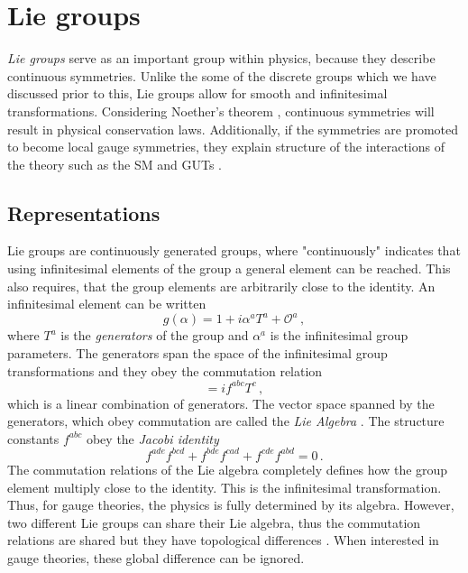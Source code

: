 \section{Lie groups} \label{app:Lie}
\textit{Lie groups} serve as an important group within physics, because they describe continuous symmetries. Unlike the some of the discrete groups which we have discussed prior to this, Lie groups allow for smooth and infinitesimal transformations. Considering Noether's theorem \cite{Peskin:1995ev}, continuous symmetries will result in physical conservation laws. Additionally, if the symmetries are promoted to become local gauge symmetries, they explain structure of the interactions of the theory such as the SM and GUTs \cite{Peskin:1995ev}. 
\subsection{Representations}
Lie groups are continuously generated groups, where "continuously" indicates that using infinitesimal elements of the group a general element can be reached. This also requires, that the group elements are arbitrarily close to the identity. An infinitesimal element can be written \cite{Georgi:1999wka}
\begin{equation}
    g(\alpha)=1+i\alpha^aT^a + \mathcal{O}^a\,,\label{eq:inftetrans}
\end{equation}
where $T^a$ is the \textit{generators} of the group and $\alpha^a$ is the infinitesimal group parameters. The generators span the space of the infinitesimal group transformations and they obey the commutation relation
\begin{equation}
    [T^a,T^b]=if^{abc}T^c\,,\label{eq:comTa}
\end{equation}
which is a linear combination of generators. The vector space spanned by the generators, which obey commutation are called the \textit{Lie Algebra} \cite{Peskin:1995ev}. The structure constants $f^{abc}$ obey the \textit{Jacobi identity}
\begin{equation}
    f^{ade}f^{bcd}+f^{bde}f^{cad}+f^{cde}f^{abd}=0\,.\label{eq:jacobi}
\end{equation}
The commutation relations of the Lie algebra completely defines how the group element multiply close to the identity. This is the infinitesimal transformation. Thus, for gauge theories, the physics is fully determined by its algebra. However, two different Lie groups can share their Lie algebra, thus the commutation relations are shared but they have topological differences \cite{Peskin:1995ev}. When interested in gauge theories, these global difference can be ignored. 

